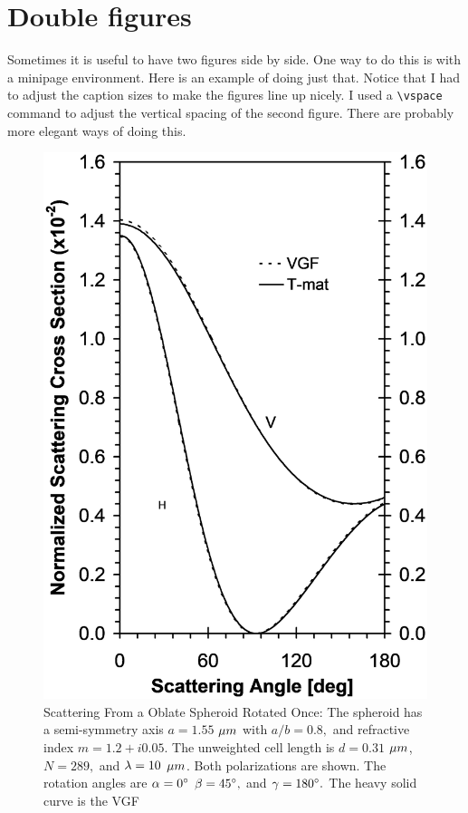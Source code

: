 \section{Double figures}
Sometimes it is useful to have two figures side by side. One way to do this is with a minipage environment. Here is an example of doing just that. Notice that I had to adjust the caption sizes to make the figures line up nicely. I used a \verb|\vspace| command to adjust the vertical spacing of the second figure. There are probably more elegant ways of doing this.
\begin{figure}[!htb]
	\centering
	\begin{minipage}{.5\textwidth}
		\centering
		\includegraphics[width=0.8\linewidth, height=0.35\textheight]{test60b}
		\caption{Scattering From a Oblate Spheroid Rotated Once: The spheroid 
			has a semi-symmetry axis $a=1.55$ $\protect\mu m$ with $a/b=0.8,$ 
			and refractive index $m=1.2+i0.05.$ The unweighted cell length is 
			$d=0.31$ $\protect\mu m$, $N=289,$ and $\protect\lambda =10$ 
			$\protect\mu m$. Both polarizations are shown. The rotation angles 
			are $\protect\alpha =0^{\circ }$ $\protect\beta =45^{\circ },$ and 
			$\protect\gamma =180^{\circ }.$ The heavy solid curve is the VGF 
}
\end{minipage}
\end{figure}
